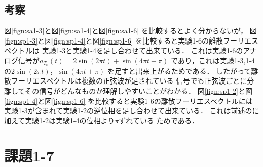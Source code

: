 \documentclass[11pt, a4paper, titlepage]{ltjsarticle}
\begin{document}
\subsection*{考察}
図\ref*{fign:sa1-3}と図\ref*{fign:sa1-4}と図\ref*{fign:sa1-6}
を比較するとよく分からないが，
図\ref*{fign:sp1-3}と図\ref*{fign:sp1-4}と図\ref*{fign:sp1-6}
を比較すると実験1-6の離散フーリエスペクトルは
実験1-3と実験1-4を足し合わせて出来ている．
これは実験1-6のアナログ信号が$a_{T_{0}}(t)=2\sin(2\pi t)+\sin(4\pi t+\pi)$
であり，これは実験1-3,1-4の$2\sin(2\pi t)$，$\sin(4\pi t+\pi)$
を足すと出来上がるためである．
したがって離散フーリエスペクトルは複数の正弦波が足されている
信号でも正弦波ごとに分離してその信号がどんなものか理解しやすいことがわかる．
図\ref*{fign:sp1-2}と図\ref*{fign:sp1-4}と図\ref*{fign:sp1-6}
を比較すると実験1-6の離散フーリエスペクトルには
実験1-3が含まれて実験1-2の逆位相を足し合わせて出来ている．
これは前述のに加えて実験1-2は実験1-4の位相より$\pi$ずれている
ためである．



\newpage
\section*{課題1-7}
\end{document}
